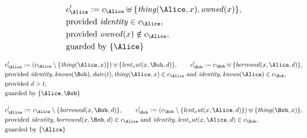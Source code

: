 \begin{align*}
&
c'_
{
\Alice
}
 := 
c_
{
\Alice
}
 \uplus 
\{
\mathit{
thing
}
(
\Alice
,
x
)
,
\mathit{
owned
}
(
x
)
\}
,\\
&
\text{provided } 
\mathit{
identity
}
 \in c_
{
\Alice
}
,\\
&
\text{provided } 
\mathit{
owned
}
(
x
)
 \notin c_
{
\Alice
}
,\\
&
\text{guarded by } \{
\Alice
\}
\end{align*}

\begin{align*}
&
c'_
{
\Alice
}
 := 
(c_
{
\Alice
}
 \setminus 
\{
\mathit{
thing
}
(
\Alice
,
x
)
\}
) \uplus 
\{
\mathit{
lent_out
}
(
x
,
\Bob
,
d
)
\}
, \qquad 
c'_
{
\Bob
}
 := 
c_
{
\Bob
}
 \uplus 
\{
\mathit{
borrowed
}
(
x
,
\Alice
,
d
)
\}
,\\
&
\text{provided } 
\mathit{
identity
}
,
\mathit{
knows
}
(
\Bob
)
,
\mathit{
date
}
(
t
)
,
\mathit{
thing
}
(
\Alice
,
x
)
 \in c_
{
\Alice
}
 \text{ and } 
\mathit{
identity
}
,
\mathit{
knows
}
(
\Alice
)
 \in c_
{
\Bob
}
,\\
&
\text{provided } 
d
>
t
,\\
&
\text{guarded by } \{
\Alice
,
\Bob
\}
\end{align*}

\begin{align*}
&
c'_
{
\Alice
}
 := 
c_
{
\Alice
}
 \setminus 
\{
\mathit{
borrowed
}
(
x
,
\Bob
,
d
)
\}
, \qquad 
c'_
{
\Bob
}
 := 
(c_
{
\Bob
}
 \setminus 
\{
\mathit{
lent_out
}
(
x
,
\Alice
,
d
)
\}
) \uplus 
\{
\mathit{
thing
}
(
\Bob
,
x
)
\}
,\\
&
\text{provided } 
\mathit{
identity
}
,
\mathit{
borrowed
}
(
x
,
\Bob
,
d
)
 \in c_
{
\Alice
}
 \text{ and } 
\mathit{
identity
}
,
\mathit{
lent_out
}
(
x
,
\Alice
,
d
)
 \in c_
{
\Bob
}
,\\
&
\text{guarded by } \{
\Alice
\}
\end{align*}
